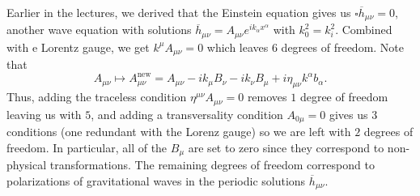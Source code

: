 \documentclass{../../templates/lkx_pset}
\begin{document}
\begin{parts}
  Earlier in the lectures, we derived that the Einstein equation gives us $\square \overline{h}_{\mu\nu} = 0$, another wave equation with solutions $\overline{h}_{\mu\nu}= A_{\mu\nu} e^{ik_\alpha x^\alpha}$ with $k_0^2 = k_i^2$. Combined with e Lorentz gauge, we get $k^\mu A_{\mu\nu} =0$ which leaves 6 degrees of freedom. Note that
  \[
    A_{\mu\nu} \mapsto A^{\textrm{new}}_{\mu\nu} = A_{\mu\nu} - ik_\mu B_\nu - ik_\nu B_\mu + i\eta_{\mu\nu} k^\alpha b_\alpha.
  \]
  Thus, adding the traceless condition $\eta^{\mu\nu} A_{\mu\nu}=0$ removes $1$ degree of freedom leaving us with $5$, and adding a transversality condition $A_{0\mu}=0$ gives us $3$ conditions (one redundant with the Lorenz gauge) so we are left with $2$ degrees of freedom. In particular, all of the $B_{\mu}$ are set to zero since they correspond to non-physical transformations. The remaining degrees of freedom correspond to polarizations of gravitational waves in the periodic solutions $\overline{h}_{\mu\nu}$.
\end{parts}
\end{document}
